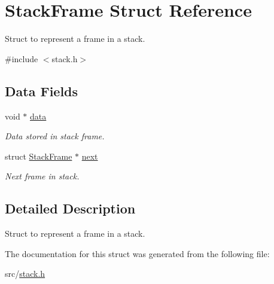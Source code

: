 \hypertarget{structStackFrame}{}\section{Stack\+Frame Struct Reference}
\label{structStackFrame}


Struct to represent a frame in a stack.  




{\ttfamily \#include $<$stack.\+h$>$}

\subsection*{Data Fields}
\begin{DoxyCompactItemize}
\item 
\mbox{\label{structStackFrame_ab1244a66ca695b22efbc50b1857c8bb3}} 
void $\ast$ \hyperlink{structStackFrame_ab1244a66ca695b22efbc50b1857c8bb3}{data}
\begin{DoxyCompactList}\small\item\em Data stored in stack frame. \end{DoxyCompactList}\item 
\mbox{\label{structStackFrame_a3cb6ca230d221991df6c9f554aa7a43b}} 
struct \hyperlink{structStackFrame}{Stack\+Frame} $\ast$ \hyperlink{structStackFrame_a3cb6ca230d221991df6c9f554aa7a43b}{next}
\begin{DoxyCompactList}\small\item\em Next frame in stack. \end{DoxyCompactList}\end{DoxyCompactItemize}


\subsection{Detailed Description}
Struct to represent a frame in a stack. 

The documentation for this struct was generated from the following file\+:\begin{DoxyCompactItemize}
\item 
src/\hyperlink{stack_8h}{stack.\+h}\end{DoxyCompactItemize}
